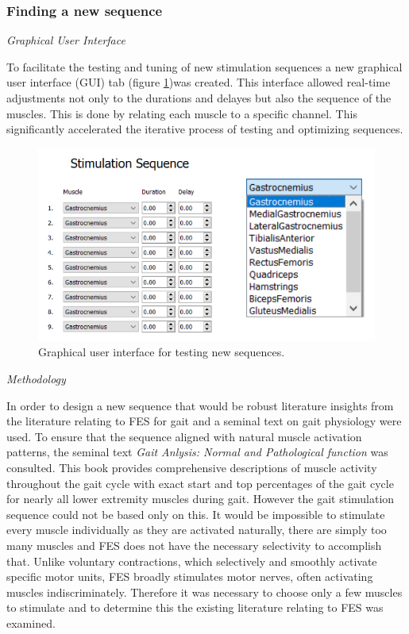 \subsubsection{Finding a new sequence}

\textit{Graphical User Interface}

To facilitate the testing and tuning of new stimulation sequences a new graphical user interface (GUI) tab (figure \ref{fig:sequenceGUI})was created. This interface allowed real-time adjustments not only to the durations and delayes but also the sequence of the muscles. This is done by relating each muscle to a specific channel. This significantly accelerated the iterative process of testing and optimizing sequences. 

\begin{figure} [h]
    \centering
    \includegraphics[width=0.8\linewidth]{images/sequenceGUI.png}
    \caption{Graphical user interface for testing new sequences.}
    \label{fig:sequenceGUI}
\end{figure}

\textit{Methodology}

In order to design a new sequence that would be robust literature insights from the literature relating to FES for gait and a seminal text on gait physiology were used. To ensure that the sequence aligned with natural muscle activation patterns, the seminal text \textit{Gait Anlysis: Normal and Pathological function} \cite{perry_gait_2024} was consulted. This book provides comprehensive descriptions of muscle activity throughout the gait cycle with exact start and top percentages of the gait cycle for nearly all lower extremity muscles during gait. However the gait stimulation sequence could not be based only on this. It would be impossible to stimulate every muscle individually as they are activated naturally, there are simply too many muscles and FES does not have the necessary selectivity to accomplish that. Unlike voluntary contractions, which selectively and smoothly activate specific motor units, FES broadly stimulates motor nerves, often activating muscles indiscriminately. Therefore it was necessary to choose only a few muscles to stimulate and to determine this the existing literature relating to FES was examined.

